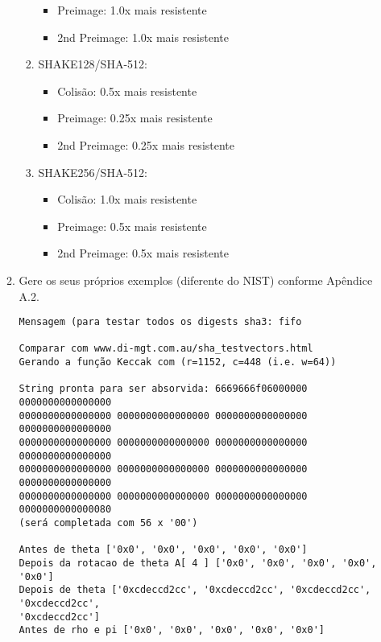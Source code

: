 \documentclass[12pt, a4paper]{article}
\begin{document}
\begin{enumerate}
\begin{enumerate}
\begin{enumerate}
\begin{itemize}
 \item Preimage: 1.0x mais resistente

 \item 2nd Preimage: 1.0x mais resistente
 \end{itemize}
\item SHAKE128/SHA-512:
 \begin{itemize}
 \item Colisão: 0.5x mais resistente

 \item Preimage: 0.25x mais resistente

 \item 2nd Preimage: 0.25x mais resistente
 \end{itemize}
\item SHAKE256/SHA-512:
 \begin{itemize}
 \item Colisão: 1.0x mais resistente

 \item Preimage: 0.5x mais resistente

 \item 2nd Preimage: 0.5x mais resistente\\
 \end{itemize}
\end{enumerate}

\item Gere os seus próprios exemplos (diferente do NIST) conforme Apêndice
A.2.\\

\begin{verbatim}
Mensagem (para testar todos os digests sha3: fifo

Comparar com www.di-mgt.com.au/sha_testvectors.html
Gerando a função Keccak com (r=1152, c=448 (i.e. w=64))

String pronta para ser absorvida: 6669666f06000000 0000000000000000
0000000000000000 0000000000000000 0000000000000000 0000000000000000
0000000000000000 0000000000000000 0000000000000000 0000000000000000
0000000000000000 0000000000000000 0000000000000000 0000000000000000
0000000000000000 0000000000000000 0000000000000000 0000000000000080
(será completada com 56 x '00')

Antes de theta ['0x0', '0x0', '0x0', '0x0', '0x0']
Depois da rotacao de theta A[ 4 ] ['0x0', '0x0', '0x0', '0x0', '0x0']
Depois de theta ['0xcdeccd2cc', '0xcdeccd2cc', '0xcdeccd2cc', '0xcdeccd2cc',
'0xcdeccd2cc']
Antes de rho e pi ['0x0', '0x0', '0x0', '0x0', '0x0']


\end{verbatim}
\end{enumerate}
\end{enumerate}
\end{document}
